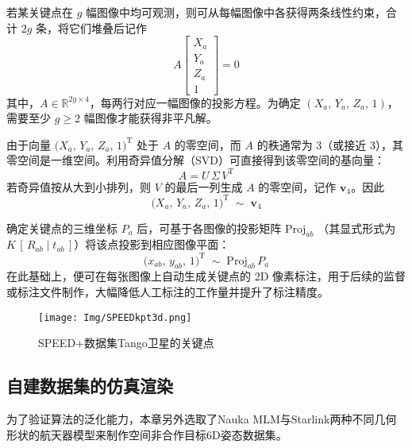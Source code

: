 若某关键点在 $g$ 幅图像中均可观测，则可从每幅图像中各获得两条线性约束，合计 $2g$ 条，将它们堆叠后记作
\begin{equation}\label{eq:Aeq0}
	A 
	\begin{bmatrix}
		X_a\\[3pt]
		Y_a\\[3pt]
		Z_a\\[3pt]
		1
	\end{bmatrix}
	=
	0
\end{equation}
其中，$A \in \mathbb{R}^{2g\times 4}$，每两行对应一幅图像的投影方程。为确定 \((X_a,\,Y_a,\,Z_a,\,1)\)，需要至少 \(g \ge 2\) 幅图像才能获得非平凡解。

由于向量 \(\bigl(X_a,\,Y_a,\,Z_a,\,1\bigr)^{\mathrm{T}}\) 处于 \(A\) 的零空间，而 \(A\) 的秩通常为 3（或接近 3），其零空间是一维空间。利用奇异值分解（SVD）可直接得到该零空间的基向量：
\begin{equation}
	A = U\,\Sigma\,V^\mathrm{T}
\end{equation}
若奇异值按从大到小排列，则 \(V\) 的最后一列生成 \(A\) 的零空间，记作 \(\mathbf{v}_4\)。因此
\begin{equation}
	\bigl(X_a,\,Y_a,\,Z_a,\,1\bigr)^\mathrm{T}
	\;\sim\;
	\mathbf{v}_4
\end{equation}

确定关键点的三维坐标 \(P_a\) 后，可基于各图像的投影矩阵 \(\mathrm{Proj}_{ab}\)
（其显式形式为 \(K\,[\,R_{ab}\mid t_{ab}\,]\)）将该点投影到相应图像平面：
\begin{equation}
	\bigl(x_{ab},\,y_{ab},\,1\bigr)^\mathrm{T}
	\;\sim\;
	\mathrm{Proj}_{ab}\,P_a
\end{equation}
在此基础上，便可在每张图像上自动生成关键点的 2D 像素标注，用于后续的监督或标注文件制作，大幅降低人工标注的工作量并提升了标注精度。





\begin{figure}[htbp]
	\centering
	\texttt{[image: Img/SPEEDkpt3d.png]}
	\caption{SPEED+数据集Tango卫星的关键点}
	\label{fig:SPEEDpluskpt}
\end{figure}

\subsection{自建数据集的仿真渲染}

为了验证算法的泛化能力，本章另外选取了Nauka MLM与Starlink两种不同几何形状的航天器模型来制作空间非合作目标6D姿态数据集。

